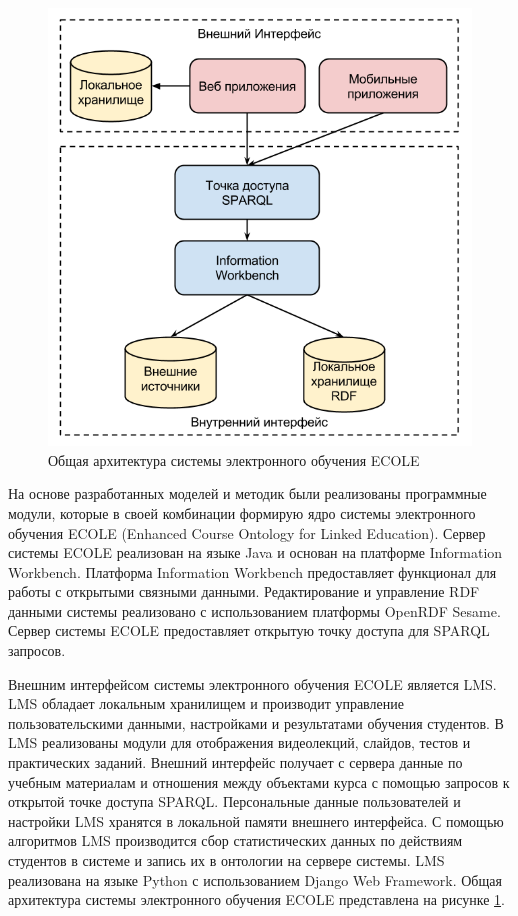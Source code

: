 \begin{figure}[ht] 
  \center
  \includegraphics[scale=0.40]{OverallArch}
  \caption{Общая архитектура системы электронного обучения ECOLE} 
  \label{fig:OverallArch}
\end{figure}


На основе разработанных моделей и методик были реализованы программные модули, которые в своей комбинации формирую ядро системы электронного обучения ECOLE (Enhanced Course Ontology for Linked Education). Сервер системы ECOLE реализован на языке Java и основан на платформе Information Workbench. Платформа Information Workbench предоставляет функционал для работы с открытыми связными данными. Редактирование и управление RDF данными системы реализовано с использованием платформы OpenRDF Sesame. Сервер системы ECOLE предоставляет открытую точку доступа для SPARQL запросов. 

Внешним интерфейсом системы электронного обучения ECOLE является LMS. LMS обладает локальным хранилищем и производит управление пользовательскими данными, настройками и результатами обучения студентов. В LMS реализованы модули для отображения видеолекций, слайдов, тестов и практических заданий. Внешний интерфейс получает с сервера данные по учебным материалам и отношения между объектами курса с помощью запросов к открытой точке доступа SPARQL. Персональные данные пользователей и настройки LMS хранятся в локальной памяти внешнего интерфейса. С помощью алгоритмов LMS производится сбор статистических данных по действиям студентов в системе и запись их в онтологии на сервере системы. LMS реализована на языке Python с использованием Django Web Framework. Общая архитектура системы электронного обучения ECOLE представлена на рисунке \ref{fig:OverallArch}.



